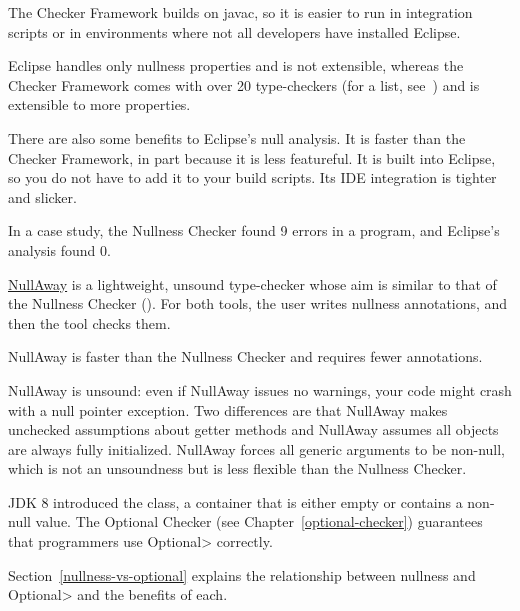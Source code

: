 The Checker Framework builds on javac, so it is easier to run in
integration scripts or in
environments where not all developers have installed Eclipse.

Eclipse handles only nullness properties and is not extensible, whereas the
Checker Framework comes with over 20 type-checkers (for a list,
see~) and is extensible to more properties.

There are also some benefits to Eclipse's null analysis.
It is faster than the Checker Framework, in part because it is less featureful.
It is built into Eclipse, so you do not have to add it to your build scripts.
Its IDE integration is tighter and slicker.

In a case study, the Nullness Checker found 9 errors in a program, and
Eclipse's analysis found 0.



\href{https://github.com/uber/NullAway}{NullAway} is a lightweight, unsound
type-checker whose aim is similar to that of the Nullness Checker
().  For both tools, the user writes
nullness annotations, and then the tool checks them.

NullAway is faster than the Nullness Checker and requires fewer annotations.

NullAway is unsound:  even if NullAway issues no warnings, your code might
crash with a null pointer exception.  Two differences are that NullAway
makes unchecked assumptions about getter methods and NullAway assumes all
objects are always fully initialized.  NullAway forces all generic
arguments to be non-null, which is not an unsoundness but is less flexible
than the Nullness Checker.



JDK 8 introduced the 
class, a container that is either empty or contains a non-null value.
The Optional Checker (see Chapter~\ref{optional-checker}) guarantees that
programmers use \<Optional> correctly.

Section~\ref{nullness-vs-optional} explains the relationship between
nullness and \<Optional> and the benefits of each.


